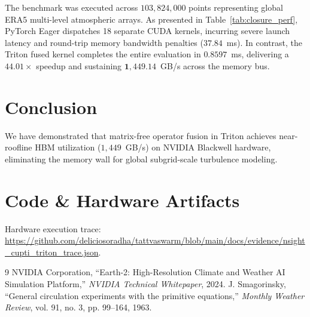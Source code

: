 \documentclass[10pt,twocolumn]{article}
\begin{document}
The benchmark was executed across $103,824,000$ points representing global ERA5 multi-level atmospheric arrays. As presented in Table~\ref{tab:closure_perf}, PyTorch Eager dispatches 18 separate CUDA kernels, incurring severe launch latency and round-trip memory bandwidth penalties ($37.84$~ms). In contrast, the Triton fused kernel completes the entire evaluation in $\mathbf{0.8597}$~ms, delivering a $\mathbf{44.01\times}$ speedup and sustaining $\mathbf{1,449.14}$~GB/s across the memory bus.

\section{Conclusion}
We have demonstrated that matrix-free operator fusion in Triton achieves near-roofline HBM utilization ($1,449$~GB/s) on NVIDIA Blackwell hardware, eliminating the memory wall for global subgrid-scale turbulence modeling.

\section*{Code \& Hardware Artifacts}
Hardware execution trace: \url{https://github.com/deliciosoradha/tattvaswarm/blob/main/docs/evidence/nsight_cupti_triton_trace.json}.

\begin{thebibliography}{9}
NVIDIA Corporation, ``Earth-2: High-Resolution Climate and Weather AI Simulation Platform,'' \textit{NVIDIA Technical Whitepaper}, 2024.
J. Smagorinsky, ``General circulation experiments with the primitive equations,'' \textit{Monthly Weather Review}, vol. 91, no. 3, pp. 99--164, 1963.
\end{thebibliography}
\end{document}
